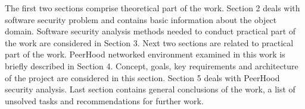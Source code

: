 %
The first two sections comprise \The theoretical part of the work. 
%
Section 2 deals with software security problem and contains basic information about the object domain. 
%
Software security analysis methods needed to conduct \The practical part of the work are considered in Section 3. 
%
Next two sections are related to \The practical part of the work. 
%
PeerHood networked environment examined in this work is briefly described in Section 4. 
%
Concept, goals, key requirements and architecture of the project are considered in this section. 
%
Section 5 deals with PeerHood security analysis. 
%
Last section contains general conclusions of the work, a list of unsolved tasks and recommendations for further work. 